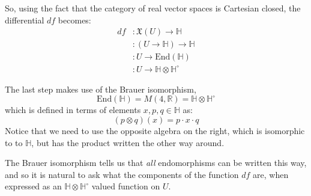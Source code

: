 \documentclass{amsart}
\providecommand{\R}{\mathbb{R}}
\providecommand{\HH}{\mathbb{H}}
\newcommand{\End}{\mathrm{End}}
\begin{document}
So, using the fact that the category of real vector spaces is Cartesian closed,
the differential $df$ becomes:
\begin{align*}
  df &: \mathfrak{X}(U) \to \HH \\
     &: (U \to \HH) \to \HH \\
     &: U \to \End(\HH) \\
     &: U \to \HH \otimes \HH^\circ
\end{align*}


The last step makes use of the Brauer isomorphism,
$$ \End(\HH) = M(4, \R) = \HH \otimes \HH^\circ $$
which is defined in terms of elements $x,p,q\in\HH$ as:
$$ (p\otimes q)(x) = p \cdot x \cdot q $$
Notice that we need to use the opposite algebra on the right, which is
isomorphic to to $\HH$, but has the product written the other way around.

The Brauer isomorphism tells us that \emph{all} endomorphisms can be written
this way, and so it is natural to ask what the components of the function $df$
are, when expressed as an $\HH\otimes\HH^\circ$ valued function on $U$.
\end{document}
